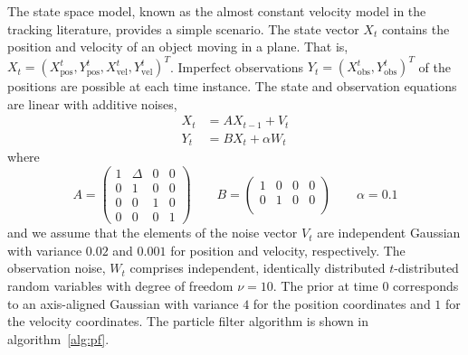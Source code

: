 \documentclass[11pt,bib,mint,hyper,altcolor]{marticle}
\def\xobs{X_{\mathrm{obs}}}
\def\xpos{X_{\mathrm{pos}}}
\def\xvel{X_{\mathrm{vel}}}
\def\yobs{Y_{\mathrm{obs}}}
\def\ypos{Y_{\mathrm{pos}}}
\def\yvel{Y_{\mathrm{vel}}}
\begin{document}
The state space model, known as the almost constant velocity model in the
tracking literature, provides a simple scenario. The state vector $X_t$
contains the position and velocity of an object moving in a plane. That is,
$X_t = (\xpos^t, \ypos^t, \xvel^t, \yvel^t)^T$. Imperfect observations $Y_t =
(\xobs^t, \yobs^t)^T$ of the positions are possible at each time instance. The
state and observation equations are linear with additive noises,
\begin{align*}
  X_t &= AX_{t-1} + V_t \\
  Y_t &= BX_t + \alpha W_t
\end{align*}
where
\begin{equation*}
  A = \begin{pmatrix}
    1 & \Delta & 0 & 0 \\
    0 & 1 & 0 & 0 \\
    0 & 0 & 1 & 0 \\
    0 & 0 & 0 & 1
  \end{pmatrix} \qquad
  B = \begin{pmatrix}
    1 & 0 & 0 & 0 \\
    0 & 1 & 0 & 0 \\
  \end{pmatrix} \qquad
  \alpha = 0.1
\end{equation*}
and we assume that the elements of the noise vector $V_t$ are independent
Gaussian with variance $0.02$ and $0.001$ for position and velocity,
respectively. The observation noise, $W_t$ comprises independent, identically
distributed $t$-distributed random variables with degree of freedom $\nu = 10$.
The prior at time $0$ corresponds to an axis-aligned Gaussian with variance $4$
for the position coordinates and $1$ for the velocity coordinates. The particle
filter algorithm is shown in algorithm~\ref{alg:pf}.
\end{document}

